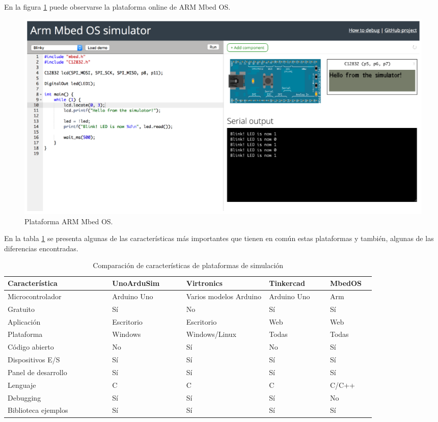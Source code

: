 En la figura \ref{fig:ArmMbed} puede observarse la plataforma online de ARM Mbed OS.


\begin{figure}[ht]
	\centering
	\includegraphics[scale=.44]{./Figures/ArmMbed.png}
	\caption{Plataforma ARM Mbed OS.}
	\label{fig:ArmMbed}
\end{figure}




En la tabla \ref{tab:simuladores} se presenta algunas de las características más importantes que tienen en común estas plataformas y también, algunas de las diferencias encontradas.


\hfill \break
\hfill \break
\hfill \break
\hfill \break
\hfill \break
\hfill \break

\begin{table}[h]
\centering
\caption[Comparación de características de plataformas de simulación]{Comparación de características de plataformas de simulación}
\begin{tabular}{p{0.24\linewidth} p{0.17\linewidth}  p{0.19\linewidth}  p{0.14\linewidth}  p{0.10\linewidth}}
\toprule
\textbf{Característica} 
& \textbf{UnoArduSim}
& \textbf{Virtronics}
& \textbf{Tinkercad}
& \textbf{MbedOS}
\\
\midrule
Microcontrolador & Arduino Uno & Varios modelos Arduino & Arduino Uno & Arm\\
Gratuito &    Sí & No & Sí & Sí\\
Aplicación & Escritorio & Escritorio & Web & Web\\
Plataforma & Windows & Windows/Linux & Todas & Todas\\
Código abierto & No & Sí & No & Sí\\
Dispositivos E/S & Sí & Sí & Sí & Sí  \\
Panel de desarrollo & Sí & Sí & Sí & Sí \\
Lenguaje & C & C & C & C/C++\\
Debugging & Sí & Sí & Sí & No\\
Biblioteca ejemplos & Sí & Sí & Sí & Sí\\
\bottomrule
\hline
\end{tabular}
\label{tab:simuladores}
\end{table}


